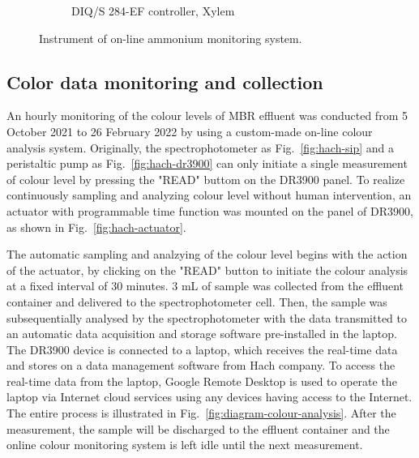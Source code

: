 \begin{figure}[h]
\begin{subfigure}{0.3\textwidth}
      \caption{DIQ/S 284-EF controller, Xylem} \label{fig:nh3-sensor-b}
    \end{subfigure}%
  \caption{Instrument of on-line ammonium monitoring system.} \label{fig:nh3-sensor}
\end{figure}

\subsection{Color data monitoring and collection}
An hourly monitoring of the colour levels of MBR effluent was conducted from 5 October 2021 to 26 February 2022 by using a custom-made on-line colour analysis system. Originally, the spectrophotometer as Fig.~\ref{fig:hach-sip} and a peristaltic pump as Fig.~\ref{fig:hach-dr3900} can only initiate a single measurement of colour level by pressing the "READ" buttom on the DR3900 panel. To realize continuously sampling and analyzing colour level without human intervention, an actuator with programmable time function was mounted on the panel of DR3900, as shown in Fig.~\ref{fig:hach-actuator}. 

The automatic sampling and analzying of the colour level begins with the action of the actuator, by clicking on the "READ" button to initiate the colour analysis at a fixed interval of 30 minutes. 3 mL of sample was collected from the effluent container and delivered to the spectrophotometer cell. Then, the sample was subsequentially analysed by the spectrophotometer with the data transmitted to an automatic data acquisition and storage software pre-installed in the laptop. The DR3900 device is connected to a laptop, which receives the real-time data and stores on a data management software from Hach company. To access the real-time data from the laptop, Google Remote Desktop is used to operate the laptop via Internet cloud services using any devices having access to the Internet. The entire process is illustrated in Fig.~\ref{fig:diagram-colour-analysis}. After the measurement, the sample will be discharged to the effluent container and the online colour monitoring system is left idle until the next measurement. 

